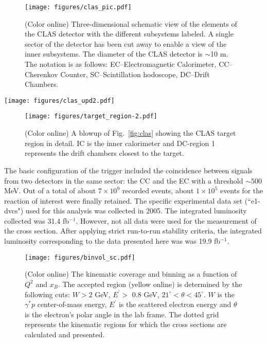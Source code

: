 \documentclass[prc,floatfix,twocolumn,superscriptaddress,letter]{revtex4}
\begin{document}
\begin{figure}
\texttt{[image: figures/clas\_pic.pdf]}
\caption{(Color online) Three-dimensional schematic  view of the elements of the CLAS detector with the different subsystems labeled. A single sector of the detector has been cut away to enable a view of the inner subsystems. The diameter of the CLAS detector is $\sim$10 m. The notation is as follows: EC--Electromagnetic Calorimeter, CC--Cherenkov Counter, SC--Scintillation hodoscope, DC--Drift Chambers. }
\label{fig:clas_pic}
\end{figure}


\begin{figure*}
\texttt{[image: figures/clas\_upd2.pdf]}
\caption{(Color online) Schematic view of the CLAS detector constructed by the Monte-Carlo simulation program GSIM.  Note, IC--inner calorimeter, EC--electromagnetic calorimeter, LAC--large angle electromagnetic calorimeter, CC--Cherenkov counter, SC--scintillation hodoscope, DC--Drift Chambers.  The LAC was not used in this analysis. The tracks correspond, from top to bottom,  to a photon (blue online), an electron (red online) curving toward the beam line, and a proton (purple online) curving away from the beam line. }
\label{fig:clas}
\end{figure*}


\begin{figure}
\texttt{[image: figures/target\_region-2.pdf]}
\caption{(Color online) A blowup of Fig.~\ref{fig:clas} showing  the CLAS target region  in detail. IC is the inner calorimeter and  DC-region 1 represents the drift chambers closest to the target. 
}\label{fig:target}
\end{figure}
The basic configuration of the trigger included the coincidence between signals from two detectors in the same sector: the CC and the EC  with a threshold $\sim 500$ MeV. 
Out of a total of about $7 \times 10^9$  recorded  events, about $1 \times 10^5$ events for the reaction of interest were finally retained.
The specific experimental data set (``e1-dvcs")  used for this analysis was collected in 2005.
The integrated luminosity collected was 31.4 fb$^{-1}$.
However, not all data were used for the measurement of the cross section. After applying strict run-to-run 
stability criteria, the integrated luminosity corresponding to the data presented here was 
 was 19.9  fb$^{-1}$.


\begin{figure}
\begin{center}
\texttt{[image: figures/binvol\_sc.pdf]}
\caption{(Color online) The kinematic coverage and binning as a function of $Q^2$ and $x_B$. 
The accepted region (yellow online) is determined by the following cuts: 
$W>2$ GeV, $E^\prime>$ 0.8 GeV, $21^\circ<\theta<45^\circ$.
$W$ is the $\gamma^*p$ center-of-mass energy, $E^\prime$ is the scattered electron energy and $\theta$ is  the  electron's polar angle in the lab frame. The dotted grid represents the kinematic regions for which the cross sections are calculated and presented. }
\label{fig:kin_cuts}
\end{center}
\end{figure}
\end{document}
